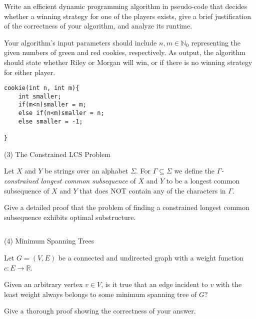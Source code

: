 \documentclass[11pt]{amsart}
\begin{document}
Write an efficient dynamic programming algorithm in pseudo-code that decides whether a winning strategy for one of the players exists,
give a brief justification of the correctness of your algorithm, and analyze its runtime.\medskip

Your algorithm's input parameters should include $n, m \in \mathbb{N}_0$ representing the given numbers of green 
and red cookies, respectively. As output, the algorithm should state whether Riley or Morgan will win, or if there is no
winning strategy for either player.\\
\newpage
\begin{lstlisting}
cookie(int n, int m){
    int smaller;
    if(m<n)smaller = m;
    else if(n<m)smaller = n;
    else smaller = -1;
    
}
\end{lstlisting}
\newpage
(3) The Constrained LCS Problem\medskip

Let $X$ and $Y$ be strings over an alphabet $\Sigma$. For $\Gamma\subseteq \Sigma$ we define the \emph{$\Gamma$-constrained longest common subsequence } of $X$ and $Y$ to be a longest common subsequence of $X$ and $Y$ that does NOT 
contain any of the characters in $\Gamma$.\medskip

Give a detailed proof that the problem of finding a constrained longest common subsequence exhibits optimal substructure.\\
\newpage
\begin{lstlisting}

\end{lstlisting}
\newpage
(4) Minimum Spanning Trees\medskip

Let $G=(V,E)$ be a connected and undirected graph with a weight function $c\colon E \to \mathbb{R}$. \medskip

Given an arbitrary vertex $v\in V$, is it true that an edge incident to $v$ with the least weight always belongs to some minimum spanning tree of $G$?\medskip

Give a thorough proof showing the correctness of your answer. 
\newpage
\begin{lstlisting}
\end{lstlisting}
\end{document}
